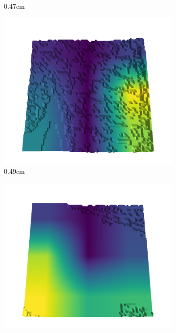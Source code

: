 \begin{figure}[H]
\begin{subfigure}[b]{0.192\linewidth}
    \caption{0.47cm}
    \label{fig : quarry-best-8}
    \end{subfigure}
    \begin{subfigure}[b]{0.192\linewidth}
    \includegraphics[width=\linewidth]{../img/5/quarry/best/49-patch-3d-majavi-colormap-80.png}
    \caption{0.49cm}
    \label{fig : quarry-best-9}
    \end{subfigure}
    \begin{subfigure}[b]{0.192\linewidth}
    \includegraphics[width=\linewidth]{../img/5/quarry/best/51-patch-3d-majavi-colormap-90.png}

\end{subfigure}
\end{figure}
